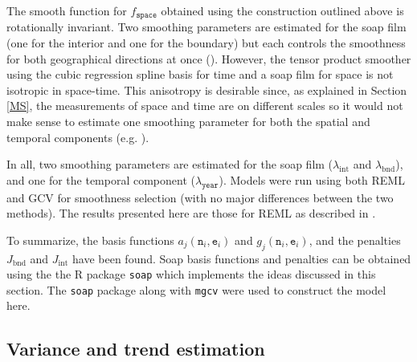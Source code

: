 The smooth function for $f_\texttt{space}$ obtained using the construction outlined above is rotationally invariant. Two smoothing parameters are estimated for the soap film (one for the interior and one for the boundary) but each controls the smoothness for both geographical directions at once (\cite{soap}). However, the tensor product smoother using the cubic regression spline basis for time and a soap film for space is not isotropic in space-time. This anisotropy is desirable since, as explained in Section \ref{MS}, the measurements of space and time are on different scales so it would not make sense to estimate one smoothing parameter for both the spatial and temporal components (e.g. \cite[p. 162]{simonbook}).
 
 In all, two smoothing parameters are estimated for the soap film ($\lambda_\text{int}$ and $\lambda_\text{bnd}$), and one for the temporal component ($\lambda_\texttt{year}$). Models were run using both REML and GCV for smoothness selection (with no major differences between the two methods). The results presented here are those for REML as described in .
 
To summarize, the basis functions $a_j(\texttt{n}_i,\texttt{e}_i)$ and $g_j(\texttt{n}_i,\texttt{e}_i)$, and the penalties $J_\text{bnd}$ and $J_\text{int}$ have been found. Soap basis functions and penalties can be obtained using the the \textsf{R} package \texttt{soap} which implements the ideas discussed in this section. The \texttt{soap} package along with \texttt{mgcv} were used to construct the model here.

\subsection{Variance and trend estimation \label{VE}}

